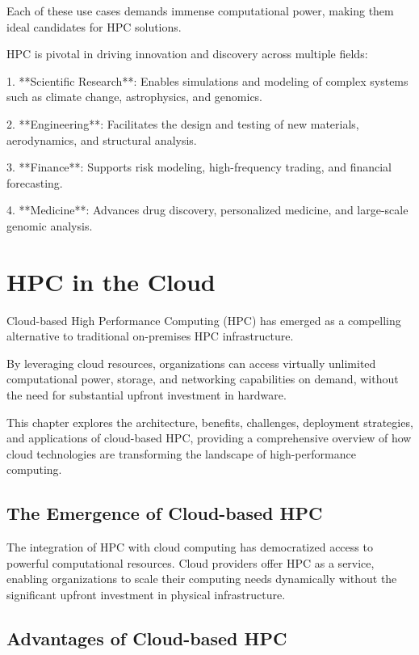 Each of these use cases demands immense computational power, making them ideal candidates for HPC solutions.

HPC is pivotal in driving innovation and discovery across multiple fields:

1. **Scientific Research**: Enables simulations and modeling of complex systems such as climate change, astrophysics, and genomics.

2. **Engineering**: Facilitates the design and testing of new materials, aerodynamics, and structural analysis.

3. **Finance**: Supports risk modeling, high-frequency trading, and financial forecasting.

4. **Medicine**: Advances drug discovery, personalized medicine, and large-scale genomic analysis.

\section{HPC in the Cloud}

Cloud-based High Performance Computing (HPC) has emerged as a compelling alternative to traditional on-premises HPC infrastructure. 

By leveraging cloud resources, organizations can access virtually unlimited computational power, storage, and networking capabilities on demand, without the need for substantial upfront investment in hardware. 

This chapter explores the architecture, benefits, challenges, deployment strategies, and applications of cloud-based HPC, providing a comprehensive overview of how cloud technologies are transforming the landscape of high-performance computing.

\subsection{The Emergence of Cloud-based HPC}

The integration of HPC with cloud computing has democratized access to powerful computational resources. Cloud providers offer HPC as a service, enabling organizations to scale their computing needs dynamically without the significant upfront investment in physical infrastructure.

\subsection{Advantages of Cloud-based HPC}

